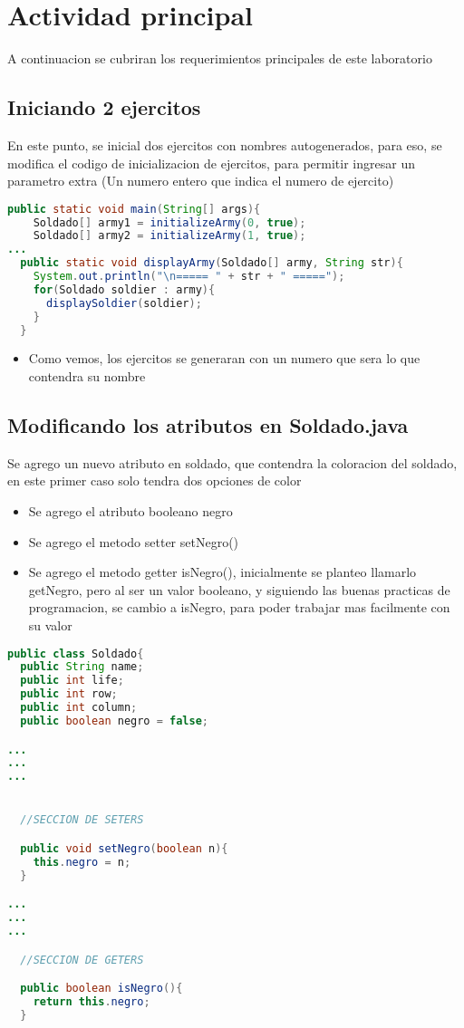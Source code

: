 \section{Actividad principal}
A continuacion se cubriran los requerimientos principales de este laboratorio

\subsection{Iniciando 2 ejercitos}
    En este punto, se inicial dos ejercitos con nombres autogenerados, para eso, se modifica el codigo de inicializacion de ejercitos, para permitir ingresar un parametro extra (Un numero entero que indica el numero de ejercito)
\begin{lstlisting}[language=java, caption={Codigo fuente, Videojuego.java}]
public static void main(String[] args){
    Soldado[] army1 = initializeArmy(0, true); 
    Soldado[] army2 = initializeArmy(1, true); 
... 
  public static void displayArmy(Soldado[] army, String str){
    System.out.println("\n===== " + str + " =====");
    for(Soldado soldier : army){
      displaySoldier(soldier);
    }
  }
\end{lstlisting}
\begin{itemize}
  \item Como vemos, los ejercitos se generaran con un numero que sera lo que contendra su nombre
\end{itemize}
\subsection{Modificando los atributos en Soldado.java}

Se agrego un nuevo atributo en soldado, que contendra la coloracion del soldado, en este primer caso solo tendra dos opciones de color
\begin{itemize}
  \item Se agrego el atributo booleano negro
  \item Se agrego el metodo setter setNegro()
  \item Se agrego el metodo getter isNegro(), inicialmente se planteo llamarlo getNegro, pero al ser un valor booleano, y siguiendo las buenas practicas de programacion, se cambio a isNegro, para poder trabajar mas facilmente con su valor
\end{itemize}
\begin{lstlisting}[language=java, caption={Codigo fuente, Videojuego.java}]
public class Soldado{
  public String name;
  public int life;
  public int row;
  public int column;
  public boolean negro = false;

... 
... 
... 


  //SECCION DE SETERS

  public void setNegro(boolean n){
    this.negro = n;
  }

... 
... 
... 

  //SECCION DE GETERS

  public boolean isNegro(){
    return this.negro;
  }
\end{lstlisting}

